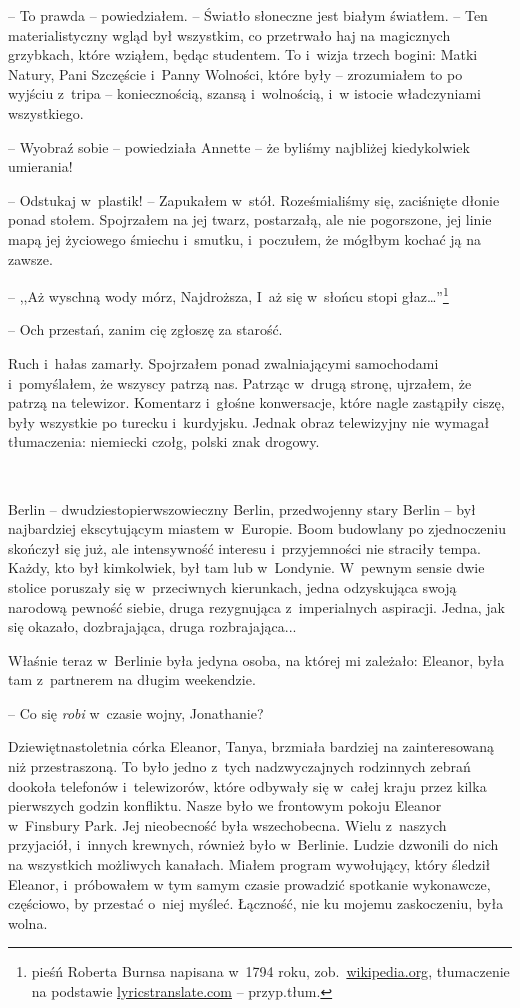 \documentclass[oneside,polish,11pt,sfheadings]{mwbk}
\begin{document}
-- To prawda -- powiedziałem. -- Światło słoneczne jest białym światłem. -- Ten materialistyczny wgląd był wszystkim, co przetrwało haj na
magicznych grzybkach, które wziąłem, będąc studentem. To i~wizja trzech
bogini: Matki Natury, Pani Szczęście i~Panny Wolności, które były -- zrozumiałem to po wyjściu z~tripa -- koniecznością, szansą i~wolnością, i~w istocie władczyniami wszystkiego.

-- Wyobraź sobie -- powiedziała Annette -- że byliśmy najbliżej
kiedykolwiek umierania!

-- Odstukaj w~plastik! -- Zapukałem w~stół. Roześmialiśmy się, zaciśnięte
dłonie ponad stołem. Spojrzałem na jej twarz, postarzałą, ale nie
pogorszone, jej linie mapą jej życiowego śmiechu i~smutku, i~poczułem,
że mógłbym kochać ją na zawsze.

-- ,,Aż wyschną wody mórz, Najdroższa, I~aż się w~słońcu stopi głaz\ldots''\footnote{pieśń Roberta Burnsa napisana w~1794 roku,
zob.~\href{https://en.wikipedia.org/wiki/A_Red,_Red_Rose}{wikipedia.org},
tłumaczenie na podstawie
\href{https://lyricstranslate.com/en/red-red-rose-mi\%C5\%82a-ma-jak-czerwona-r\%C3\%B3\%C5\%BCa.html}{lyricstranslate.com} -- przyp.tłum.} 

-- Och przestań, zanim cię zgłoszę za starość.

Ruch i~hałas zamarły. Spojrzałem ponad zwalniającymi samochodami i~pomyślałem, że wszyscy patrzą nas. Patrząc w~drugą stronę, ujrzałem, że
patrzą na telewizor. Komentarz i~głośne konwersacje, które nagle
zastąpiły ciszę, były wszystkie po turecku i~kurdyjsku. Jednak obraz
telewizyjny nie wymagał tłumaczenia: niemiecki czołg, polski znak
drogowy.

~

Berlin -- dwudziestopierwszowieczny Berlin, przedwojenny stary Berlin -- był najbardziej ekscytującym miastem w~Europie. Boom budowlany po
zjednoczeniu skończył się już, ale intensywność interesu i~przyjemności
nie straciły tempa. Każdy, kto był kimkolwiek, był tam lub w~Londynie. W~pewnym sensie dwie stolice poruszały się w~przeciwnych kierunkach, jedna
odzyskująca swoją narodową pewność siebie, druga rezygnująca z~imperialnych aspiracji. Jedna, jak się okazało, dozbrajająca, druga
rozbrajająca...

Właśnie teraz w~Berlinie była jedyna osoba, na której mi zależało:
Eleanor, była tam z~partnerem na długim weekendzie.

-- Co się \emph{robi} w~czasie wojny, Jonathanie?

Dziewiętnastoletnia córka Eleanor, Tanya, brzmiała bardziej na
zainteresowaną niż przestraszoną. To było jedno z~tych nadzwyczajnych
rodzinnych zebrań dookoła telefonów i~telewizorów, które odbywały się w~całej kraju przez kilka pierwszych godzin konfliktu. Nasze było we
frontowym pokoju Eleanor w~Finsbury Park. Jej nieobecność była
wszechobecna. Wielu z~naszych przyjaciół, i~innych krewnych, również
było w~Berlinie. Ludzie dzwonili do nich na wszystkich możliwych
kanałach. Miałem program wywołujący, który śledził Eleanor, i~próbowałem
w tym samym czasie prowadzić spotkanie wykonawcze, częściowo, by
przestać o~niej myśleć. Łączność, nie ku mojemu zaskoczeniu, była wolna.
\end{document}
